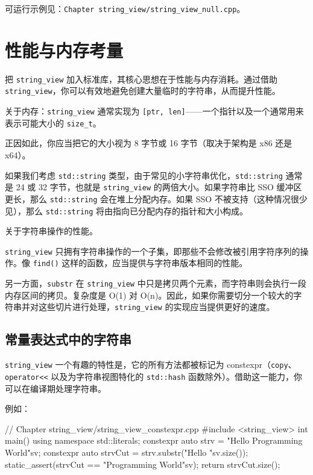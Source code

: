 可运行示例见：\texttt{Chapter string\_view/string\_view\_null.cpp}。

\section{性能与内存考量}

把 \texttt{string\_view} 加入标准库，其核心思想在于性能与内存消耗。通过借助 \texttt{string\_view}，你可以有效地避免创建大量临时的字符串，从而提升性能。

关于内存：\texttt{string\_view} 通常实现为 \texttt{[ptr, len]}——一个指针以及一个通常用来表示可能大小的 \texttt{size\_t}。

正因如此，你应当把它的大小视为 8 字节或 16 字节（取决于架构是 x86 还是 x64）。

如果我们考虑 \texttt{std::string} 类型，由于常见的小字符串优化，\texttt{std::string} 通常是 24 或 32 字节，也就是 \texttt{string\_view} 的两倍大小。如果字符串比 SSO 缓冲区更长，那么 \texttt{std::string} 会在堆上分配内存。如果 SSO 不被支持（这种情况很少见），那么 \texttt{std::string} 将由指向已分配内存的指针和大小构成。

关于字符串操作的性能。

\texttt{string\_view} 只拥有字符串操作的一个子集，即那些不会修改被引用字符序列的操作。像 \texttt{find()} 这样的函数，应当提供与字符串版本相同的性能。

另一方面，\texttt{substr} 在 \texttt{string\_view} 中只是拷贝两个元素，而字符串则会执行一段内存区间的拷贝。复杂度是 O(1) 对 O(n)。因此，如果你需要切分一个较大的字符串并对这些切片进行处理，\texttt{string\_view} 的实现应当提供更好的速度。

\subsection{常量表达式中的字符串}

\texttt{string\_view} 一个有趣的特性是，它的所有方法都被标记为 constexpr（\texttt{copy}、\texttt{operator<<} 以及为字符串视图特化的 \texttt{std::hash} 函数除外）。借助这一能力，你可以在编译期处理字符串。

例如：

\begin{codebox}[cpp]
// Chapter string_view/string_view_constexpr.cpp
#include <string_view>
int main()
{
using namespace std::literals;
constexpr auto strv = "Hello Programming World"sv;
constexpr auto strvCut = strv.substr("Hello "sv.size());
static_assert(strvCut == "Programming World"sv);
return strvCut.size();
}
\end{codebox}

